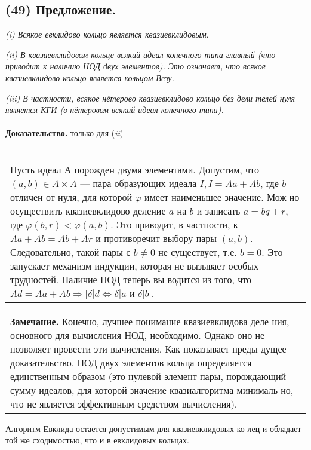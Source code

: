 \documentclass{mai_book}
\begin{document}
\subsection*{(49) Предложение.}

\textit{(i) Всякое евклидово кольцо является квазиевклидовым}.

\textit{(ii) В квазиевклидовом кольце всякий идеал конечного типа главный
(что приводит к наличию НОД двух элементов). Это означает, что
всякое квазиевклидово кольцо является кольцом Везу.}

\textit{(iii) В частности, всякое нётерово квазиевклидово кольцо без дели­
телей нуля является КГИ (в нётеровом всякий идеал конечного типа).
}
\\\\
\noindent\textbf{Доказательство.} только для (\textit{ii})
\\\\
\hspace*{15pt}\begin{tabular}{|p{12.5cm}}
Пусть идеал $А$ порожден двумя элементами. Допустим, что
$(a, b)\in A \times A$ — пара образующих идеала $I, I = Aa + Ab$, где $b$
отличен от нуля, для которой $\varphi$ имеет наименьшее значение. Мож­
но осуществить квазиевклидово деление $a$ на $b$ и записать $a=bq+r$,
где $\varphi(b,r) < \varphi(a, b)$. Это приводит, в частности, к $Aa+Ab=Ab+Ar$
и противоречит выбору пары $(a,b)$. Следовательно, такой пары с
$b\neq0$ не существует, т.е. $b=0$. Это запускает механизм индукции,
которая не вызывает особых трудностей. Наличие НОД теперь вы­
водится из того, что $Ad = Aa + Ab \Rightarrow[\delta|d \Longleftrightarrow \delta|a$ и $\delta|b]$.
\end{tabular}
\newpage
\begin{center}
\begin{tabular}{p{12cm}}
\textbf{Замечание.} Конечно, лучшее понимание квазиевклидова деле­
ния, основного для вычисления НОД, необходимо. Однако оно
не позволяет провести эти вычисления. Как показывает преды­
дущее доказательство, НОД двух элементов кольца определяется
единственным образом (это нулевой элемент пары, порождающий
сумму идеалов, для которой значение квазиалгоритма минималь­
но, что не является эффективным средством вычисления).
\end{tabular}
\end{center}

Алгоритм Евклида остается допустимым для квазиевклидовых ко­
лец и обладает той же сходимостью, что и в евклидовых кольцах.
\end{document}
